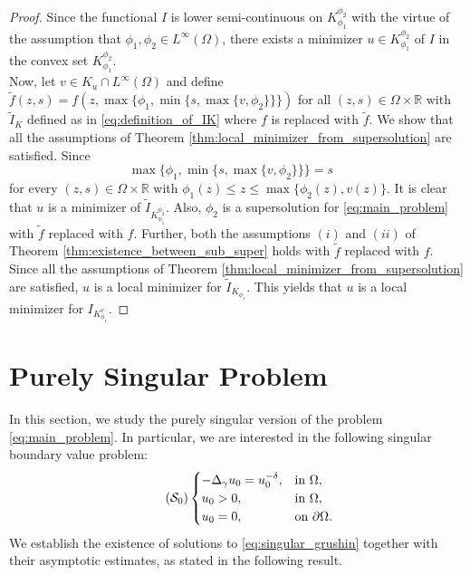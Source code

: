 \documentclass[11pt]{article}
\newcommand{\om} {\Omega}
\newcommand{\real}{\mathbb{R}}
\newcommand{\Gr}{\Delta_{\gamma}}
\begin{document}
\begin{proof}
Since the functional $I$ is lower semi-continuous on $K_{\phi_1}^{\phi_2}$ with the virtue of the assumption that $\phi_1, \phi_2 \in L^{\infty}(\om)$, there exists a minimizer $u \in K_{\phi_1}^{\phi_2}$ of $I$ in the convex set $K_{\phi_1}^{\phi_2}$. \\
Now, let $v \in K_u \cap L^{\infty}(\om)$ and define $\tilde{f}(z,s) = f(z,\max \{ \phi_1, \min\{ s, \max \{ v, \phi_2\} \} \})$ for all $(z,s) \in \om \times \real$ with $\tilde{I}_K$ defined as in \eqref{eq:definition_of_IK} where $f$ is replaced with $\tilde{f}$. We show that all the assumptions of Theorem \ref{thm:local_minimizer_from_supersolution} are satisfied. Since 
\begin{equation*}
\max \{ \phi_1, \min\{ s, \max \{ v, \phi_2\} \} \} = s \quad 
\end{equation*}
for every $(z,s) \in \om \times \real$ with $\phi_1(z) \leq z \leq \max \{\phi_2(z), v(z)\}$.
It is clear that $u$ is a minimizer of $\tilde{I}_{K_{\phi_1}^{\phi_2}}$. Also, $\phi_2$ is a supersolution for \eqref{eq:main_problem} with $\tilde{f}$ replaced with $f$. Further, both the assumptions $(i)$ and $(ii)$ of Theorem \ref{thm:existence_between_sub_super} holds with $\tilde{f}$ replaced with $f$. Since all the assumptions of Theorem \ref{thm:local_minimizer_from_supersolution} are satisfied, $u$ is a local minimizer for $\tilde{I}_{K_{\phi_1}}$. This yields that $u$ is a local minimizer for $I_{K_{\phi_1}^v}$.
\end{proof}


\section{Purely Singular Problem}\label{sec:purely_singular}

In this section, we study the purely singular version of the problem \eqref{eq:main_problem}. In particular, we are interested in the following singular boundary value problem:
\begin{equation}\tag{$\mathcal{S}_0$}
\label{eq:singular_grushin}
\begin{cases}
-\Gr u_0 = u_0^{-\delta}, & \text{in } \Omega, \\
u_0 > 0, & \text{in } \Omega, \\
u_0 = 0, & \text{on } \partial \Omega.
\end{cases}
\end{equation}
We establish the existence of solutions to \eqref{eq:singular_grushin} together with their asymptotic estimates, as stated in the following result.
\end{document}
